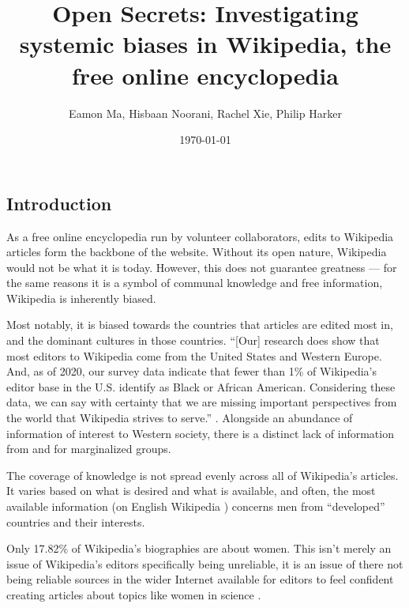\documentclass[fontsize=12pt]{article}
\title{Open Secrets: Investigating systemic biases in Wikipedia, the free online encyclopedia}
\author{Eamon Ma, Hisbaan Noorani, Rachel Xie, Philip Harker}
\date{\today}
\begin{document}
\maketitle
\begin{multicols}{2}
    \section{Introduction}
    As a free online encyclopedia run by volunteer collaborators, edits to Wikipedia articles form the backbone of the website.
    Without its open nature, Wikipedia would not be what it is today.
    However, this does not guarantee greatness --- for the same reasons it is a symbol of communal knowledge and free information, Wikipedia is inherently biased.
    
    Most notably, it is biased towards the countries that articles are edited most in, and the dominant cultures in those countries.
    ``[Our] research does show that most editors to Wikipedia come from the United States and Western Europe. And, as of 2020, our survey data indicate that fewer than 1\% of Wikipedia’s editor base in the U.S. identify as Black or African American. Considering these data, we can say with certainty that we are missing important perspectives from the world that Wikipedia strives to serve.'' \parencite{Uzzell}. Alongside an abundance of information of interest to Western society, there is a distinct lack of information from and for marginalized groups.
    
    The coverage of knowledge is not spread evenly across all of Wikipedia's articles. It varies based on what is desired and what is available, and often, the most available information (on English Wikipedia
    ) concerns men from ``developed'' countries and their interests.
    
    Only 17.82\% of Wikipedia's biographies are about women.
    This isn't merely an issue of Wikipedia's editors specifically being unreliable, it is an issue of there not being reliable sources in the wider Internet available for editors to feel confident creating articles about topics like women in science \parencite{Erhart}.
    

\end{multicols}
\end{document}
